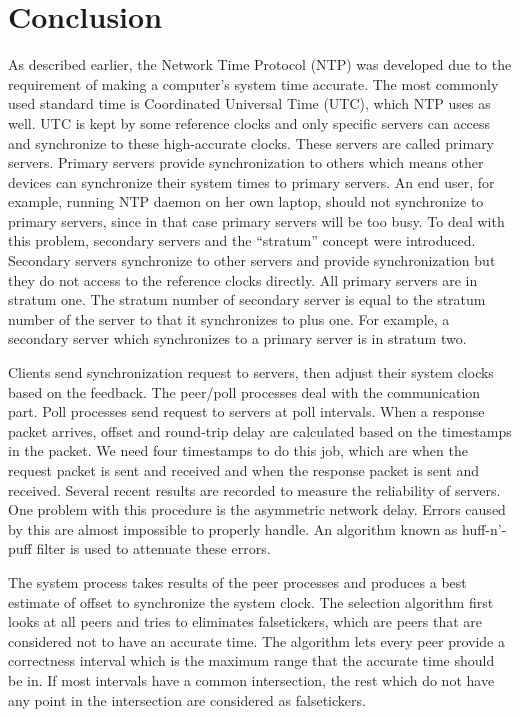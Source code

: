 
\chapter{Conclusion}
\label{cha:conclusion}

As described earlier, the Network Time Protocol (NTP) was developed due to the
requirement of making a computer's system time accurate. The most commonly used
standard time is Coordinated Universal Time (UTC), which NTP uses as well.
UTC is kept by some reference clocks and only specific servers can access and
synchronize to these high-accurate clocks. These servers are called primary
servers. Primary servers
provide synchronization to others which means other devices can synchronize
their system times to primary servers. An end user, for example, 
running NTP daemon on her own laptop, should not synchronize to
primary servers, since in that case primary servers will be too busy. To deal
with this problem, secondary servers and the ``stratum'' concept were
introduced.
Secondary servers synchronize to other servers and provide synchronization but
they do not access to the reference clocks directly.   All primary servers are
in stratum one. The stratum number of
secondary server is equal to the stratum number of the server to that it synchronizes
to plus one. For example, a secondary server which synchronizes to a primary
server is in stratum two. 

Clients send synchronization request to servers, then adjust their
system clocks based on the feedback. The peer/poll processes deal with the
communication part. Poll processes send request to servers at poll intervals.
When a response packet arrives, offset and round-trip delay are calculated
based on the timestamps in the packet. We need four timestamps to do this job,
which are when the request packet is sent and received and when the response
packet is sent and received. Several recent results are recorded to measure
the reliability of servers. One problem with this procedure is the asymmetric
network delay.  Errors caused by this are almost impossible to properly handle.
An algorithm known as huff-n'-puff filter is used to attenuate these errors.

The system process takes results of the peer processes and produces a best
estimate of offset to synchronize the system clock. The selection algorithm
first looks at all peers and tries to eliminates falsetickers, which are peers
that are considered not to have an accurate time. The algorithm lets every peer
provide a correctness interval which is the maximum range that the accurate
time should be in. If most intervals have a common intersection, the rest which
do not have any point in the intersection are considered as falsetickers. 

